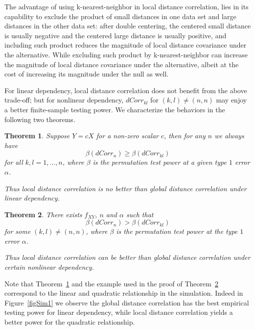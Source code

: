 \documentclass[12pt]{article}
\newtheorem{thm}{Theorem}
\begin{document}
The advantage of using k-nearest-neighbor in local distance correlation, lies in its capability to exclude the product of small distances in one data set and large distances in the other data set: after double centering, the centered small distance is usually negative and the centered large distance is usually positive, and including such product reduces the magnitude of local distance covariance under the alternative. While excluding such product by k-nearest-neighbor can increase the magnitude of local distance covariance under the alternative, albeit at the cost of increasing its magnitude under the null as well. 

For linear dependency, local distance correlation does not benefit from the above trade-off; but for nonlinear dependency, $dCorr_{kl}$ for $(k,l) \neq (n,n)$ may enjoy a better finite-sample testing power. We characterize the behaviors in the following two theorems.

\begin{thm}
\label{thm2}
Suppose $Y=cX$ for a non-zero scalar $c$, then for any $n$ we always have
\begin{equation}
\label{equ1}
\beta(dCorr_{n}) \geq \beta(dCorr_{kl})
\end{equation}
for all $k,l=1,\ldots,n$, where $\beta$ is the permutation test power at a given type $1$ error $\alpha$.

Thus local distance correlation is no better than global distance correlation under linear dependency.
\end{thm}

\begin{thm}
\label{thm3}
There exists $f_{XY}$, $n$ and $\alpha$ such that 
\begin{equation}
\label{equ2}
\beta(dCorr_{n}) > \beta(dCorr_{kl})
\end{equation}
for some $(k,l) \neq (n,n)$, where $\beta$ is the permutation test power at the type $1$ error $\alpha$.

Thus local distance correlation can be better than global distance correlation under certain nonlinear dependency.
\end{thm}
Note that Theorem~\ref{thm2} and the example used in the proof of Theorem~\ref{thm3} correspond to the linear and quadratic relationship in the simulation. Indeed in Figure~\ref{figSim1} we observe the global distance correlation has the best empirical testing power for linear dependency, while local distance correlation yields a better power for the quadratic relationship.
\end{document}
